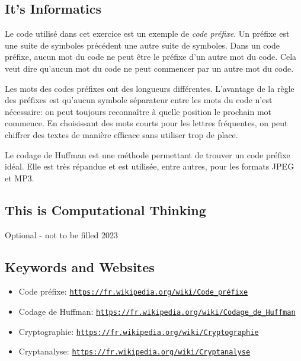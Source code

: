 \documentclass[a4paper,11pt]{report}
\newcommand{\BrochureUrlText}[1]{\texttt{#1}}
\begin{document}
\subsection*{It’s Informatics}

Le code utilisé dans cet exercice est un exemple de \emph{code préfixe}. Un préfixe est une suite de symboles précédent une autre suite de symboles. Dans un code préfixe, aucun mot du code ne peut être le préfixe d’un autre mot du code. Cela veut dire qu’aucun mot du code ne peut commencer par un autre mot du code.

Les mots des codes préfixes ont des longueurs différentes. L’avantage de la règle des préfixes est qu’aucun symbole séparateur entre les mots du code n’est nécessaire: on peut toujours reconnaître à quelle position le prochain mot commence. En choisissant des mots courts pour les lettres fréquentes, on peut chiffrer des textes de manière efficace sans utiliser trop de place.

Le codage de Huffman est une méthode permettant de trouver un code préfixe idéal. Elle est très répandue et est utilisée, entre autres, pour les formats JPEG et MP3.


\subsection*{This is Computational Thinking}

Optional - not to be filled 2023

{\raggedright

\subsection*{Keywords and Websites}

\begin{itemize}
  \item Code préfixe: \href{https://fr.wikipedia.org/wiki/Code_pr\%C3\%A9fixe}{\BrochureUrlText{https://fr.wikipedia.org/wiki/Code\_préfixe}}
  \item Codage de Huffman: \href{https://fr.wikipedia.org/wiki/Codage_de_Huffman}{\BrochureUrlText{https://fr.wikipedia.org/wiki/Codage\_de\_Huffman}}
  \item Cryptographie: \href{https://fr.wikipedia.org/wiki/Cryptographie}{\BrochureUrlText{https://fr.wikipedia.org/wiki/Cryptographie}}
  \item Cryptanalyse: \href{https://fr.wikipedia.org/wiki/Cryptanalyse}{\BrochureUrlText{https://fr.wikipedia.org/wiki/Cryptanalyse}}
\end{itemize}


}
\end{document}
